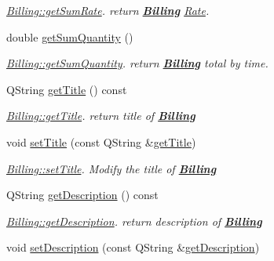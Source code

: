 \begin{DoxyCompactItemize}
\begin{DoxyCompactList}\small\item\em \hyperlink{classModels_1_1Billing_ab12d213423acfe0e0b7b1f6b43a92e28}{Billing\-::get\-Sum\-Rate}. return {\bfseries \hyperlink{classModels_1_1Billing}{Billing}} \hyperlink{classModels_1_1Rate}{Rate}. \end{DoxyCompactList}\item 
double \hyperlink{classModels_1_1Billing_a360006189d4867e3281009b0c465bc53}{get\-Sum\-Quantity} ()
\begin{DoxyCompactList}\small\item\em \hyperlink{classModels_1_1Billing_a360006189d4867e3281009b0c465bc53}{Billing\-::get\-Sum\-Quantity}. return {\bfseries \hyperlink{classModels_1_1Billing}{Billing}} total by time. \end{DoxyCompactList}\item 
Q\-String \hyperlink{classModels_1_1Billing_a15cd358ce3cab05668c62c0771afdb85}{get\-Title} () const 
\begin{DoxyCompactList}\small\item\em \hyperlink{classModels_1_1Billing_a15cd358ce3cab05668c62c0771afdb85}{Billing\-::get\-Title}. return title of {\bfseries \hyperlink{classModels_1_1Billing}{Billing}} \end{DoxyCompactList}\item 
void \hyperlink{classModels_1_1Billing_ae20cea169abdffa5daaa368547425928}{set\-Title} (const Q\-String \&\hyperlink{classModels_1_1Billing_a15cd358ce3cab05668c62c0771afdb85}{get\-Title})
\begin{DoxyCompactList}\small\item\em \hyperlink{classModels_1_1Billing_ae20cea169abdffa5daaa368547425928}{Billing\-::set\-Title}. Modify the title of {\bfseries \hyperlink{classModels_1_1Billing}{Billing}} \end{DoxyCompactList}\item 
Q\-String \hyperlink{classModels_1_1Billing_a5802215da8f4407457b8aeb7be525c65}{get\-Description} () const 
\begin{DoxyCompactList}\small\item\em \hyperlink{classModels_1_1Billing_a5802215da8f4407457b8aeb7be525c65}{Billing\-::get\-Description}. return description of {\bfseries \hyperlink{classModels_1_1Billing}{Billing}} \end{DoxyCompactList}\item 
void \hyperlink{classModels_1_1Billing_adb5cf4382150387f10bb6b774ace6bc8}{set\-Description} (const Q\-String \&\hyperlink{classModels_1_1Billing_a5802215da8f4407457b8aeb7be525c65}{get\-Description})

\end{DoxyCompactItemize}
